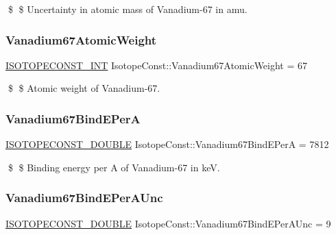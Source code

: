 \$ \$ Uncertainty in atomic mass of Vanadium-\/67 in amu. \mbox{\label{group___isotope_const-_vanadium-_v67_gaaf98168c75468c8e28f63e6aa88c22ab}} 
\subsubsection{\texorpdfstring{Vanadium67\+Atomic\+Weight}{Vanadium67AtomicWeight}}
{\footnotesize\ttfamily \mbox{\hyperlink{group___isotope_const-_macros_ga5f18360b3e99483a35c32d789e62621c}{I\+S\+O\+T\+O\+P\+E\+C\+O\+N\+S\+T\+\_\+\+I\+NT}} Isotope\+Const\+::\+Vanadium67\+Atomic\+Weight = 67}

\$ \$ Atomic weight of Vanadium-\/67. \mbox{\label{group___isotope_const-_vanadium-_v67_ga002270d0141ffc1cd715be6e1796d9d1}} 
\subsubsection{\texorpdfstring{Vanadium67\+Bind\+E\+PerA}{Vanadium67BindEPerA}}
{\footnotesize\ttfamily \mbox{\hyperlink{group___isotope_const-_macros_ga8f45a7272ce02c0b4c65c44636ed719a}{I\+S\+O\+T\+O\+P\+E\+C\+O\+N\+S\+T\+\_\+\+D\+O\+U\+B\+LE}} Isotope\+Const\+::\+Vanadium67\+Bind\+E\+PerA = 7812}

\$ \$ Binding energy per A of Vanadium-\/67 in keV. \mbox{\label{group___isotope_const-_vanadium-_v67_gac2ea3db2c9286907ee43e1280c121576}} 
\subsubsection{\texorpdfstring{Vanadium67\+Bind\+E\+Per\+A\+Unc}{Vanadium67BindEPerAUnc}}
{\footnotesize\ttfamily \mbox{\hyperlink{group___isotope_const-_macros_ga8f45a7272ce02c0b4c65c44636ed719a}{I\+S\+O\+T\+O\+P\+E\+C\+O\+N\+S\+T\+\_\+\+D\+O\+U\+B\+LE}} Isotope\+Const\+::\+Vanadium67\+Bind\+E\+Per\+A\+Unc = 9}

